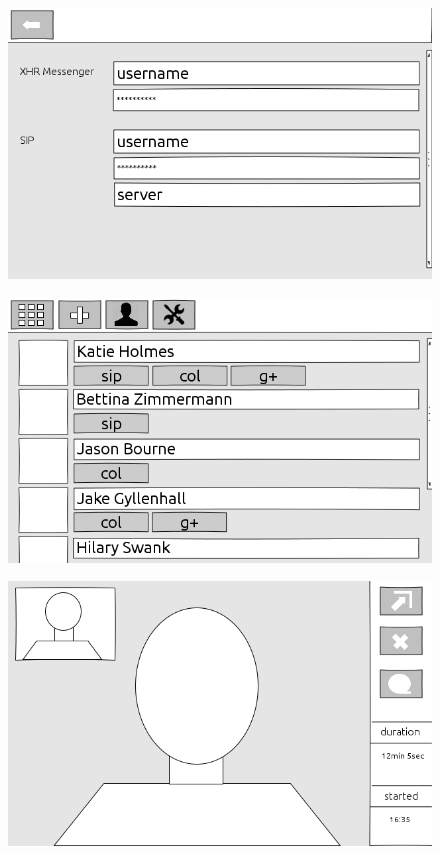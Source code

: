 \begin{landscape}
\begin{figure}[H]
		\includegraphics[width=1.4\textwidth]{../ui/img/uiDraft2/User view - add channel.png}
		\label{user management screen}
	\end{figure}
	\begin{figure}[H]
		\centering
		\includegraphics[width=1.4\textwidth]{../ui/img/uiDraft2/Contactbook view.png}
		\label{contactbook screen}
	\end{figure}
	\begin{figure}[H]
		\centering
		\includegraphics[width=1.4\textwidth]{../ui/img/uiDraft2/Phone view.png}

\end{figure}
\end{landscape}
